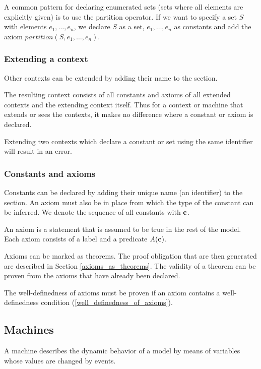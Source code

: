 A common pattern for declaring enumerated sets (sets where all elements are explicitly given)
is to use the partition operator. If we want to specify a set $S$ with elements $e_1,\ldots,e_n$,
we declare $S$ as a set, $e_1,\ldots,e_n$ as constants and add the axiom $partition(S,e_1,\ldots,e_n)$.

\subsubsection{Extending a context}
\label{extendind_a_context}
Other contexts can be extended by adding their name to the  section.

The resulting context consists of all constants and axioms of all extended contexts and the extending context itself.
Thus for a context or machine that extends or sees the contexts, it makes no difference where a constant or axiom is declared.

Extending two contexts which declare a constant or set using the same identifier will result in an error.

\subsubsection{Constants and axioms}
\label{constants_and_axioms}
Constants can be declared by adding their unique name (an identifier) to the  section.
An axiom must also be in place from which the type of the constant can be inferred.
We denote the sequence of all constants with $\mathbf{c}$.

An axiom is a statement that is assumed to be true in the rest of the model.
Each axiom consists of a label and a predicate $A(\mathbf{c})$.

Axioms can be marked as theorems. The proof obligation that are then generated are described in Section \ref{axioms_as_theorems}.
The validity of a theorem can be proven from the axioms that have already been declared.

The well-definedness of axioms must be proven if an axiom contains a well-definedness condition (\ref{well_definedness_of_axioms}).

\subsection{Machines}
\label{machine}

A machine describes the dynamic behavior of a model by means of variables whose values are changed by events.

